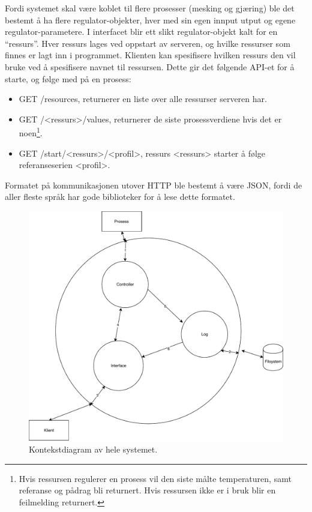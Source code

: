 Fordi systemet skal være koblet til flere prosesser (mesking og gjæring) ble det bestemt å ha flere regulator-objekter, hver med sin egen innput utput og egene regulator-parametere. I interfacet blir ett slikt regulator-objekt kalt for en ``ressurs''. Hver ressurs lages ved oppstart av serveren, og hvilke ressurser som finnes er lagt inn i programmet. Klienten kan spesifisere hvilken ressurs den vil bruke ved å spesifisere navnet til ressursen. Dette gir det følgende API-et for å starte, og følge med på en prosess:
\begin{itemize}
    \item GET /resources, returnerer en liste over alle ressurser serveren har.
    \item GET /<ressurs>/values, returnerer de siste prosessverdiene hvis det er noen\footnote{Hvis ressursen regulerer en prosess vil den siste målte temperaturen, samt referanse og pådrag bli returnert. Hvis ressursen ikke er i bruk blir en feilmelding returnert.}.
    \item GET /start/<ressurs>/<profil>, ressurs <ressurs> starter å følge referanseserien <profil>.
\end{itemize}

Formatet på kommunikasjonen utover HTTP ble bestemt å være JSON, fordi de aller fleste språk har gode biblioteker for å lese dette formatet.

\begin{figure}
    \includegraphics[width=\textwidth]{figures/system.pdf}
    \caption{Kontekstdiagram av hele systemet.}
    \label{fig:system}
\end{figure}

